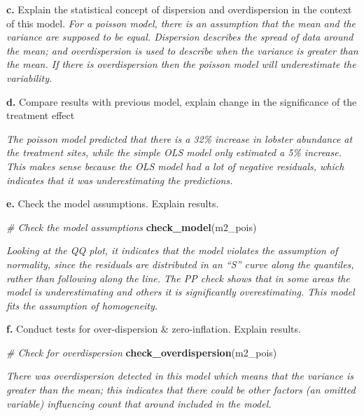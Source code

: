 \documentclass[
]{article}
\newenvironment{Shaded}{\begin{snugshade}}{\end{snugshade}}
\newcommand{\CommentTok}[1]{\textcolor[rgb]{0.56,0.35,0.01}{\textit{#1}}}
\newcommand{\FunctionTok}[1]{\textcolor[rgb]{0.13,0.29,0.53}{\textbf{#1}}}
\newcommand{\NormalTok}[1]{#1}
\begin{document}
\textbf{c.} Explain the statistical concept of dispersion and
overdispersion in the context of this model. \emph{For a poisson model,
there is an assumption that the mean and the variance are supposed to be
equal. Dispersion describes the spread of data around the mean; and
overdispersion is used to describe when the variance is greater than the
mean. If there is overdispersion then the poisson model will
underestimate the variability.}

\textbf{d.} Compare results with previous model, explain change in the
significance of the treatment effect

\emph{The poisson model predicted that there is a 32\% increase in
lobster abundance at the treatment sites, while the simple OLS model
only estimated a 5\% increase. This makes sense because the OLS model
had a lot of negative residuals, which indicates that it was
underestimating the predictions.}

\textbf{e.} Check the model assumptions. Explain results.

\begin{Shaded}
\begin{Highlighting}[]
\CommentTok{\# Check the model assumptions}
\FunctionTok{check\_model}\NormalTok{(m2\_pois)}
\end{Highlighting}
\end{Shaded}

\emph{Looking at the QQ plot, it indicates that the model violates the
assumption of normality, since the residuals are distributed in an ``S''
curve along the quantiles, rather than following along the line. The PP
check shows that in some areas the model is underestimating and others
it is significantly overestimating. This model fits the assumption of
homogeneity. }

\textbf{f.} Conduct tests for over-dispersion \& zero-inflation. Explain
results.

\begin{Shaded}
\begin{Highlighting}[]
\CommentTok{\# Check for overdispersion}
\FunctionTok{check\_overdispersion}\NormalTok{(m2\_pois)}
\end{Highlighting}
\end{Shaded}

\emph{There was overdispersion detected in this model which means that
the variance is greater than the mean; this indicates that there could
be other factors (an omitted variable) influencing count that around
included in the model.}
\end{document}
